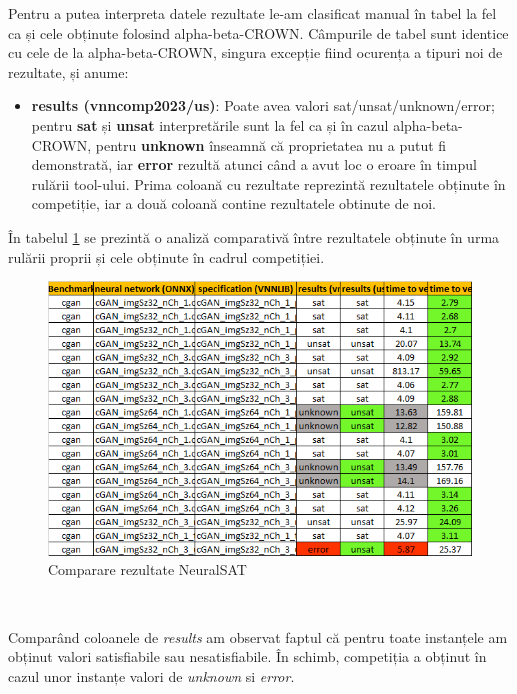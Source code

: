\hspace{0.5 cm}
Pentru a putea interpreta datele rezultate le-am clasificat manual în tabel la fel ca și cele obținute folosind alpha-beta-CROWN. Câmpurile de tabel sunt identice cu cele de la alpha-beta-CROWN, singura excepție fiind ocurența a tipuri noi de rezultate, și anume:
\begin{itemize}
    \item \textbf{results (vnncomp2023/us)}: Poate avea valori sat/unsat/unknown/error; pentru \textbf{sat} și \textbf{unsat} interpretările sunt la fel ca și în cazul alpha-beta-CROWN, pentru \textbf{unknown} înseamnă că proprietatea nu a putut fi demonstrată, iar \textbf{error} rezultă atunci când a avut loc o eroare în timpul rulării tool-ului.
    Prima coloană cu rezultate reprezintă rezultatele obținute în competiție, iar a două coloană contine rezultatele obtinute de noi.
\end{itemize}

În tabelul \ref{fig:image2} se prezintă o analiză comparativă între rezultatele obținute în urma rulării proprii și cele obținute în cadrul competiției.

\begin{figure}[h]
\centering 
\includegraphics[width=0.8\linewidth]{imagini/interpretare rezultate/NeuralSAT_comp_vs_us.png}
\caption{Comparare rezultate NeuralSAT}
\label{fig:image2} 
\end{figure}
\

Comparând coloanele de \textit{results} am observat faptul că pentru toate instanțele am obținut valori satisfiabile sau nesatisfiabile. În schimb, competiția a obținut în cazul unor instanțe valori de \textit{unknown} si \textit{error}.


